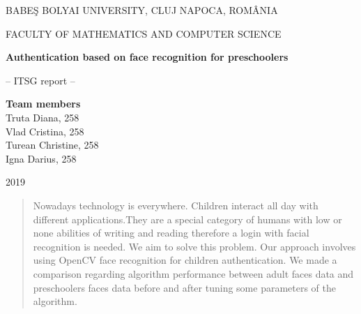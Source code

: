 \documentclass[runningheads,a4paper,11pt]{report}
\begin{document}
\begin{titlepage}
\sloppy
\begin{center}
BABE\c S BOLYAI UNIVERSITY, CLUJ NAPOCA, ROM\^ ANIA

FACULTY OF MATHEMATICS AND COMPUTER SCIENCE

\vspace{6cm}

\Huge \textbf{Authentication based on face recognition for preschoolers}

\vspace{1cm}

\normalsize -- ITSG report --

\end{center}


\vspace{5cm}

\begin{flushright}
\Large{\textbf{Team members}}\\
Truta Diana,  258 \\
Vlad Cristina,  258 \\
Turean Christine, 258 \\
Igna Darius, 258 \\

\end{flushright}

\vspace{4cm}

\begin{center}
2019
\end{center}

\end{titlepage}


\begin{abstract}
	Nowadays technology is everywhere. Children interact all day with different applications.They are a special category of humans with low or none abilities of writing and reading therefore a login with facial recognition is needed. We aim to solve this problem. Our approach  involves using OpenCV face recognition for children authentication. We made a comparison regarding algorithm performance between adult faces data and preschoolers faces data before and after tuning some parameters of the algorithm. \end{abstract}


\tableofwcontents

\newpage

\listoftables
\listoffigures
\end{document}
